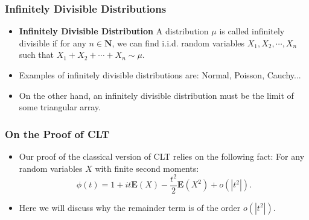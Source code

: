 \documentclass[handout]{beamer}
\newcommand{\BE}{\mathbf{E}}
\begin{document}
\frame
{
\frametitle{Infinitely Divisible Distributions}
\begin{itemize}

\item<1->\textbf{Infinitely Divisible Distribution} A distribution $\mu$ is called infinitely divisible if for any $n\in \mathbf{N}$, we can find i.i.d. random variables $X_1, X_2, \cdots, X_n$ such that $X_1+X_2+\cdots+ X_n\sim \mu$.  

\item<2-> Examples of infinitely divisible distributions are: Normal, Poisson, Cauchy...

\item<3-> On the other hand, an infinitely divisible distribution must be the limit of some triangular array. 
\end{itemize}
}



\frame
{
  \frametitle{On the Proof of CLT}
   \begin{itemize}

\item<1->Our proof of the classical version of CLT relies on the following fact:  For any random variables $X$ with finite second moments: 
$$\phi(t)=1+it\BE(X)-\frac{t^2}{2} \BE(X^2)+o(|t^2|).$$



\item<2-> Here we will discuss why the remainder term is of the order $o(|t^2|)$.

%
%
%


\end{itemize}
}
\end{document}
